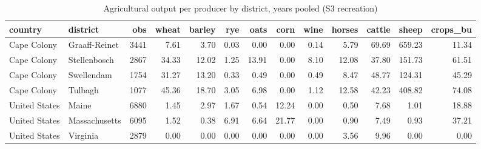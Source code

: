 \begin{table}

\caption{Agricultural output per producer by district, years pooled (S3 recreation)}
\centering
\begin{tabular}[t]{llrrrrrrrrrrr}
\toprule
country & district & obs & wheat & barley & rye & oats & corn & wine & horses & cattle & sheep & crops\_bu\\
\midrule
Cape Colony & Graaff-Reinet & 3441 & 7.61 & 3.70 & 0.03 & 0.00 & 0.00 & 0.14 & 5.79 & 69.69 & 659.23 & 11.34\\
Cape Colony & Stellenbosch & 2867 & 34.33 & 12.02 & 1.25 & 13.91 & 0.00 & 8.10 & 12.08 & 37.80 & 151.73 & 61.51\\
Cape Colony & Swellendam & 1754 & 31.27 & 13.20 & 0.33 & 0.49 & 0.00 & 0.49 & 8.47 & 48.77 & 124.31 & 45.29\\
Cape Colony & Tulbagh & 1077 & 45.36 & 18.70 & 3.05 & 6.98 & 0.00 & 1.12 & 12.58 & 42.23 & 408.82 & 74.08\\
United States & Maine & 6880 & 1.45 & 2.97 & 1.67 & 0.54 & 12.24 & 0.00 & 0.50 & 7.68 & 1.01 & 18.88\\
\addlinespace
United States & Massachusetts & 6095 & 1.52 & 0.38 & 6.91 & 6.64 & 21.77 & 0.00 & 0.90 & 7.49 & 0.93 & 37.21\\
United States & Virginia & 2879 & 0.00 & 0.00 & 0.00 & 0.00 & 0.00 & 0.00 & 3.56 & 9.96 & 0.00 & 0.00\\
\bottomrule
\end{tabular}
\end{table}
